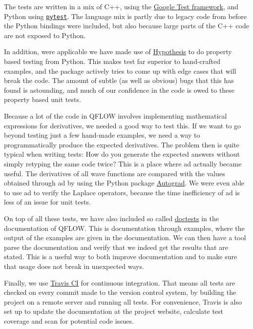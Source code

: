 \documentclass[Thesis.tex]{subfiles}
\begin{document}
The tests are written in a mix of C++, using the
\href{https://github.com/google/googletest}{Google Test framework}, and Python
using \href{https://docs.pytest.org/en/latest/}{\texttt{pytest}}. The language
mix is partly due to legacy code from before the Python bindings were included,
but also because large parts of the C++ code are not exposed to Python.

In addition, were applicable we have made use of
\href{https://hypothesis.readthedocs.io/en/latest/index.html}{Hypothesis} to do
property based testing from Python. This makes test far superior to hand-crafted
examples, and the package actively tries to come up with edge cases that will
break the code. The amount of subtle (as well as obvious) bugs that this has
found is astounding, and much of our confidence in the code is owed to these
property based unit tests.

Because a lot of the code in QFLOW involves implementing mathematical expressions for
derivatives, we needed a good way to test this. If we want to go beyond testing
just a few hand-made examples, we need a way to programmatically produce the
expected derivatives. The problem then is quite typical when writing tests: How
do you generate the expected answers without simply retyping the same code
twice? This is a place where \gls{ad} actually became useful. The derivatives of
all wave functions are compared with the values obtained through \gls{ad} by
using the Python package \href{https://github.com/HIPS/autograd}{Autograd}. We
were even able to use \gls{ad} to verify the Laplace operators, because the time
inefficiency of \gls{ad} is less of an issue for unit tests.

On top of all these tests, we have also included so called
\href{https://docs.python.org/2/library/doctest.html}{doctests} in the
documentation of QFLOW. This is documentation through examples, where the output
of the examples are given in the documentation. We can then have a tool parse
the documentation and verify that we indeed get the results that are stated.
This is a useful way to both improve documentation and to make sure that usage
does not break in unexpected ways.

Finally, we use \href{https://travis-ci.org/}{Travis CI} for continuous
integration. That means all tests are checked on every commit made to the
version control system, by building the project on a remote server and running
all tests. For convenience, Travis is also set up to update the documentation at
the project website, calculate test coverage and scan for potential code issues.
\end{document}
